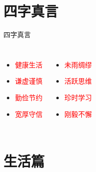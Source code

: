 \section{四字真言}
\begin{frame}{四字真言}
    \begin{columns}
    \column{5cm}
    \begin{itemize}
        \item \textcolor{red}{健康生活}
        \item \textcolor{red}{谦虚谨慎}
        \item \textcolor{red}{勤俭节约}
        \item \textcolor{red}{宽厚守信}
    \end{itemize}
    \column{5cm}
    \begin{itemize}
        \item \textcolor{red}{未雨绸缪}
        \item \textcolor{red}{活跃思维}
        \item \textcolor{red}{珍时学习}
        \item \textcolor{red}{刚毅不懈}
    \end{itemize}
    \end{columns}
\end{frame}
\section{生活篇}
